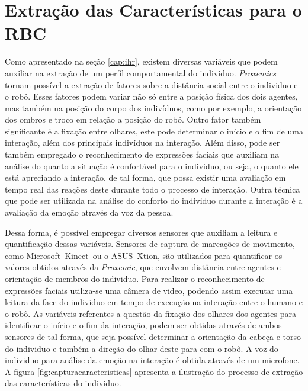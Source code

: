 \section{Extração das Características para o RBC}
\label{sec:extracaocaracteristicas}

Como apresentado na seção \ref{cap:ihr}, existem diversas variáveis que podem auxiliar na extração de um perfil comportamental do individuo. \emph{Proxemics} tornam possível a extração de fatores sobre a distância social entre o individuo e o robô. Esses fatores podem variar não só entre a posição física dos dois agentes, mas também na posição do corpo dos indivíduos, como por exemplo, a orientação dos ombros e troco em relação a posição do robô. Outro fator também significante é a fixação entre olhares, este pode determinar o início e o fim de uma interação, além dos principais indivíduos na interação. Além disso, pode ser também empregado o reconhecimento de expressões faciais que auxiliam na análise do quanto a situação é confortável para o individuo, ou seja, o quanto ele está apreciando a interação, de tal forma, que possa existir uma avaliação em tempo real das reações deste durante todo o processo de interação. Outra técnica que pode ser utilizada na análise do conforto do individuo durante a interação é a avaliação da emoção através da voz da pessoa.

Dessa forma, é possível empregar diversos sensores que auxiliam a leitura e quantificação dessas variáveis. Sensores de captura de marcações de movimento, como Microsoft\textregistered\ Kinect\textregistered\ ou o ASUS\textregistered\ Xtion\textregistered, são utilizados para quantificar os valores obtidos através da \emph{Proxemic}, que envolvem distância entre agentes e orientação de membros do individuo. Para realizar o reconhecimento de expressões faciais utiliza-se uma câmera de video, podendo assim executar uma leitura da face do individuo em tempo de execução na interação entre o humano e o robô. As variáveis referentes a questão da fixação dos olhares dos agentes para identificar o início e o fim da interação, podem ser obtidas através de ambos sensores de tal forma, que seja possível determinar a orientação da cabeça e torso do individuo e também a direção do olhar deste para com o robô. A voz do individuo para análise da emoção na interação é obtida através de um microfone. A figura \ref{fig:capturacaracteristicas} apresenta a ilustração do processo de extração das características do individuo.

